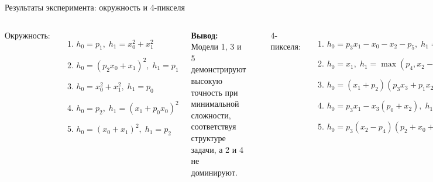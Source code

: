 \documentclass{beamer}
\begin{document}
\begin{frame}{Результаты эксперимента: окружность и 4-пикселя}
\begin{columns}[c]
Окружность: 
\begin{enumerate}
    \itemsep0em 
    \item \({\scriptstyle h_0 = p_1, \; h_1 = x_0^2 + x_1^2}\)
    \item \({\scriptstyle h_0 = (p_2x_0 + x_1)^2, \; h_1 = p_1}\)
    \item \({\scriptstyle h_0 = x_0^2 + x_1^2, \; h_1 = p_0}\)
    \item \({\scriptstyle h_0 = p_2, \; h_1 = (x_1 + p_0x_0)^2}\)
    \item \({\scriptstyle h_0 = (x_0 + x_1)^2, \; h_1 = p_2}\)
\end{enumerate}
\textbf{\scriptsize Вывод:} {\scriptsize \setlength{\baselineskip}{0.8\baselineskip} Модели 1, 3 и 5 демонстрируют высокую точность при минимальной сложности, соответствуя структуре задачи, а 2 и 4 не доминируют.\\}
\noindent
\rule{\linewidth}{0.4pt}
4-пикселя:
\begin{enumerate}
    \itemsep0em
    \item \({\scriptstyle h_0 = p_3x_1 - x_0  -x_2 - p_5, \; h_1 = p_2x_2 + x_3}\)
    \item \({\scriptstyle h_0 = x_1, \; h_1 = \max(p_4, x_2-x_0) + p_5x_2 - x_3}\)
    \item \({\scriptstyle h_0 = (x_1+p_2)(p_3x_3 + p_1x_2), \; h_1 = x_1 + p_1x_0}\)
    \item \({\scriptstyle h_0 = p_3x_1 - x_3(p_0 + x_2), \; h_1 = x_0 + p_2x_2}\)
    \item \({\scriptstyle h_0 = p_3(x_2 - p_4)(p_2 + x_0 + x_1), \; h_1 = x_1(p_1 - x_3)}\)
\end{enumerate}
\textbf{\scriptsize Вывод:} {\scriptsize \setlength{\baselineskip}{0.8\baselineskip} Все модели, кроме 2, локальны (учитывает пиксель и соседей в радиусе 2) и хорошо сбалансированы по точности, длине описания и взаимной информации.\\}
\begin{figure}

\end{figure}
\end{columns}
\end{frame}
\end{document}
